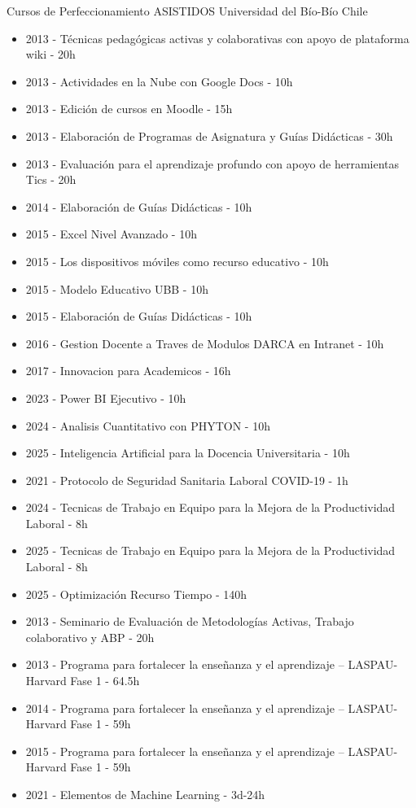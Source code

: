 {Cursos de Perfeccionamiento ASISTIDOS}
{Universidad del B\'io-B\'io}
{Chile}
{}
{\begin{itemize}
\item 2013 - T\'ecnicas pedag\'ogicas activas y colaborativas con apoyo de plataforma wiki - 20h
\item 2013 - Actividades en la Nube con Google Docs - 10h
\item 2013 - Edici\'on de cursos en Moodle - 15h
\item 2013 - Elaboraci\'on de Programas de Asignatura y Gu\'ias Did\'acticas - 30h
\item 2013 - Evaluaci\'on para el aprendizaje profundo con apoyo de herramientas Tics - 20h
\item 2014 - Elaboraci\'on de Gu\'ias Did\'acticas - 10h
\item 2015 - Excel Nivel Avanzado - 10h
\item 2015 - Los dispositivos m\'oviles como recurso educativo - 10h
\item 2015 - Modelo Educativo UBB - 10h
\item 2015 - Elaboraci\'on de Gu\'ias Did\'acticas - 10h
\item 2016 - Gestion Docente a Traves de Modulos DARCA en Intranet - 10h
\item 2017 - Innovacion para Academicos - 16h
\item 2023 - Power BI Ejecutivo - 10h
\item 2024 - Analisis Cuantitativo con PHYTON - 10h
\item 2025 - Inteligencia Artificial para la Docencia Universitaria - 10h
\item 2021 - Protocolo de Seguridad Sanitaria Laboral COVID-19 - 1h
\item 2024 - Tecnicas de Trabajo en Equipo para la Mejora de la Productividad Laboral - 8h
\item 2025 - Tecnicas de Trabajo en Equipo para la Mejora de la Productividad Laboral - 8h
\item 2025 - Optimización Recurso Tiempo - 140h
\item 2013 - Seminario de Evaluaci\'on de Metodolog\'ias Activas, Trabajo colaborativo y ABP - 20h
\item 2013 - Programa para fortalecer la enseñanza y el aprendizaje – LASPAU-Harvard Fase 1 - 64.5h
\item 2014 - Programa para fortalecer la enseñanza y el aprendizaje – LASPAU-Harvard Fase 1 - 59h
\item 2015 - Programa para fortalecer la enseñanza y el aprendizaje – LASPAU-Harvard Fase 1 - 59h
\item 2021 - Elementos de Machine Learning - 3d-24h
\end{itemize}}

\clearpage